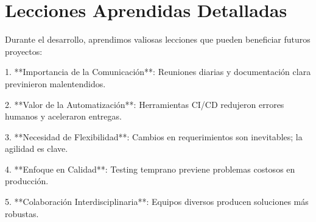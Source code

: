 \section{Lecciones Aprendidas Detalladas}

Durante el desarrollo, aprendimos valiosas lecciones que pueden beneficiar futuros proyectos:

1. **Importancia de la Comunicación**: Reuniones diarias y documentación clara previnieron malentendidos.

2. **Valor de la Automatización**: Herramientas CI/CD redujeron errores humanos y aceleraron entregas.

3. **Necesidad de Flexibilidad**: Cambios en requerimientos son inevitables; la agilidad es clave.

4. **Enfoque en Calidad**: Testing temprano previene problemas costosos en producción.

5. **Colaboración Interdisciplinaria**: Equipos diversos producen soluciones más robustas.
